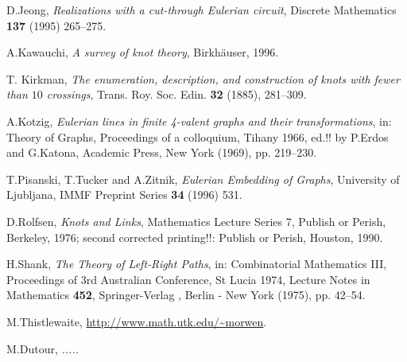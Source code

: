 \documentclass[12pt]{article}
\begin{document}
\begin{thebibliography}{99}
D.Jeong, {\em Realizations with a cut-through Eulerian circuit},
Discrete Mathematics {\bf 137} (1995) 265--275.



A.Kawauchi, {\em A survey of knot theory}, Birkh\"{a}user, 1996.

T. Kirkman, {\em The enumeration, description, and construction of knots with fewer than $10$ crossings}, Trans. Roy. Soc. Edin. {\bf 32} (1885), 281--309.


A.Kotzig, {\em Eulerian lines in finite 4-valent graphs and their 
transformations}, in: Theory of Graphs, Proceedings of a colloquium, 
Tihany 1966, ed.!! by P.Erdos and G.Katona, Academic Press, 
New York (1969), pp. 219--230.


T.Pisanski, T.Tucker and A.Zitnik, {\em Eulerian Embedding of Graphs},
University of Ljubljana, IMMF Preprint Series {\bf 34}
(1996) 531.

D.Rolfsen, {\em Knots and Links}, Mathematics Lecture Series 7, Publish or
Perish, Berkeley, 1976;
second corrected printing!!: Publish or Perish, Houston, 1990.

H.Shank, {\em The Theory of Left-Right Paths}, in: Combinatorial 
Mathematics III,
Proceedings of 3rd Australian Conference, St Lucia 1974, Lecture Notes in
Mathematics {\bf 452}, Springer-Verlag , Berlin - New York (1975),  pp. 42--54.

M.Thistlewaite, \url{http://www.math.utk.edu/~morwen}.

M.Dutour, {\em .....}



 
\end{thebibliography}
\end{document}
